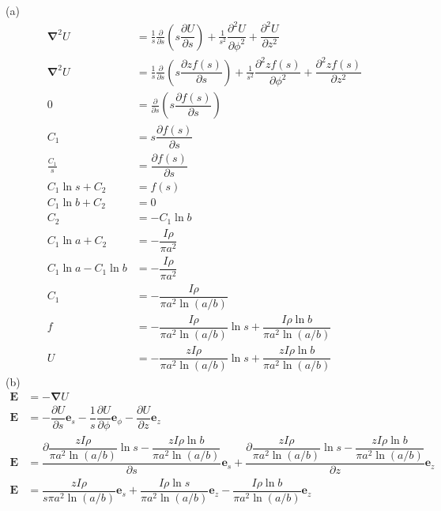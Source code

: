 (a)\begin{align*}
    \boldsymbol{\nabla}^2 U&=\frac{1}{s}\frac{\partial}{\partial s}\left(s\dfrac{{\partial U}}{\partial s}\right)
    +\frac{1}{s^2}\dfrac{{\partial^2 U}}{\partial \phi^2}
    +\dfrac{{\partial^2 U}}{\partial z^2}\\
    \boldsymbol{\nabla}^2 U&=\frac{1}{s}\frac{\partial}{\partial s}\left(s\dfrac{{\partial zf(s)}}{\partial s}\right)
    +\frac{1}{s^2}\dfrac{{\partial^2 zf(s)}}{\partial \phi^2}
    +\dfrac{{\partial^2 zf(s)}}{\partial z^2}\\
    0&=\frac{\partial}{\partial s}\left(s\dfrac{{\partial f(s)}}{\partial s}\right)\\
    C_1&=s\dfrac{{\partial f(s)}}{\partial s}\\
    \frac{C_1}{s}&=\dfrac{{\partial f(s)}}{\partial s}\\
    C_1\ln s+C_2&=f(s)\\
    C_1\ln b+C_2&=0\\
    C_2&=-C_1\ln b\\
    C_1\ln a+C_2&=-\dfrac{I\rho}{\pi a^2}\\
    C_1\ln a-C_1\ln b&=-\dfrac{I\rho}{\pi a^2}\\
    C_1&=-\dfrac{I\rho}{\pi a^2\ln(a/b)}\\
    f&=-\dfrac{I\rho}{\pi a^2\ln(a/b)}\ln s+\dfrac{I\rho \ln b}{\pi a^2\ln(a/b)}\\
    U&=-\dfrac{zI\rho}{\pi a^2\ln(a/b)}\ln s+\dfrac{zI\rho \ln b}{\pi a^2\ln(a/b)}
\end{align*}
(b)\begin{align*}
    \boldsymbol{E}&=-\boldsymbol{\nabla} U\\
    \boldsymbol{E}&=-\dfrac{\partial U}{\partial s}\boldsymbol{e}_s-\dfrac{1}{s}\dfrac{\partial U}{\partial \phi}\boldsymbol{e}_\phi-\dfrac{\partial U}{\partial z}\boldsymbol{e}_z\\
    \boldsymbol{E}&=\dfrac{\partial \dfrac{zI\rho}{\pi a^2\ln(a/b)}\ln s-\dfrac{zI\rho \ln b}{\pi a^2\ln(a/b)}}{\partial s}\boldsymbol{e}_s+\dfrac{\partial \dfrac{zI\rho}{\pi a^2\ln(a/b)}\ln s-\dfrac{zI\rho \ln b}{\pi a^2\ln(a/b)}}{\partial z}\boldsymbol{e}_z\\
    \boldsymbol{E}&=\dfrac{zI\rho}{s\pi a^2\ln(a/b)}\boldsymbol{e}_s
    +\dfrac{I\rho\ln s}{\pi a^2\ln(a/b)}\boldsymbol{e}_z-\dfrac{I\rho \ln b}{\pi a^2\ln(a/b)}\boldsymbol{e}_z
\end{align*}
